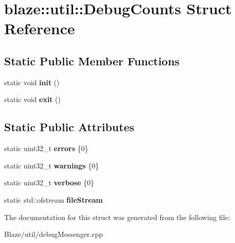 \hypertarget{structblaze_1_1util_1_1DebugCounts}{}\section{blaze\+:\+:util\+:\+:Debug\+Counts Struct Reference}
\label{structblaze_1_1util_1_1DebugCounts}
\subsection*{Static Public Member Functions}
\begin{DoxyCompactItemize}
\item 
\mbox{\label{structblaze_1_1util_1_1DebugCounts_af1defa1c0e5eda0f17f6379ff747b38a}} 
static void {\bfseries init} ()
\item 
\mbox{\label{structblaze_1_1util_1_1DebugCounts_a2e3e9a604f8d63d73f35c7dc01823536}} 
static void {\bfseries exit} ()
\end{DoxyCompactItemize}
\subsection*{Static Public Attributes}
\begin{DoxyCompactItemize}
\item 
\mbox{\label{structblaze_1_1util_1_1DebugCounts_addd3d81c7a961901dfade2ef673fb418}} 
static uint32\+\_\+t {\bfseries errors} \{0\}
\item 
\mbox{\label{structblaze_1_1util_1_1DebugCounts_a113b7c9ffd0946f912117e7b959d67cd}} 
static uint32\+\_\+t {\bfseries warnings} \{0\}
\item 
\mbox{\label{structblaze_1_1util_1_1DebugCounts_aeb7e1f567c7b7309edfc1917f7d10142}} 
static uint32\+\_\+t {\bfseries verbose} \{0\}
\item 
\mbox{\label{structblaze_1_1util_1_1DebugCounts_a77dbb673d39b6a32c9ccebd712630ec9}} 
static std\+::ofstream {\bfseries file\+Stream}
\end{DoxyCompactItemize}


The documentation for this struct was generated from the following file\+:\begin{DoxyCompactItemize}
\item 
Blaze/util/debug\+Messenger.\+cpp\end{DoxyCompactItemize}
